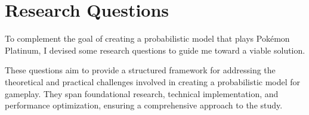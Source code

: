 \chapter{Research Questions}

To complement the goal of creating a probabilistic model that plays Pokémon Platinum, I devised some research questions to guide me toward a viable solution.

These questions aim to provide a structured framework for addressing the theoretical and practical challenges involved in creating a probabilistic model for gameplay. They span foundational research, technical implementation, and performance optimization, ensuring a comprehensive approach to the study.








